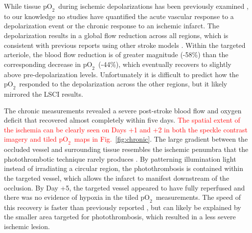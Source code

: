 \documentclass[12pt]{spieman}  %
\newcommand{\pO}{\ensuremath{\text{pO}_2}}
\begin{document}
\begin{spacing}{2}
While tissue \pO\ during ischemic depolarizations has been previously examined \cite{vonBornstadt:2015dj}, to our knowledge no studies have quantified the acute vascular response to a depolarization event or the chronic response to an ischemic infarct. The depolarization results in a global flow reduction across all regions, which is consistent with previous reports using other stroke models \cite{Shin:2006dc,Nakamura:2010wp}. Within the targeted arteriole, the blood flow reduction is of greater magnitude (-58\%) than the corresponding decrease in \pO\ (-44\%), which eventually recovers to slightly above pre-depolarization levels. Unfortunately it is difficult to predict how the \pO\ responded to the depolarization across the other regions, but it likely mirrored the LSCI results.

The chronic measurements revealed a severe post-stroke blood flow and oxygen deficit that recovered almost completely within five days. \textcolor{red}{The spatial extent of the ischemia can be clearly seen on Days +1 and +2 in both the speckle contrast imagery and tiled \pO\ maps in Fig.~\ref{fig:chronic}}. The large gradient between the occluded vessel and surrounding tissue resembles the ischemic penumbra that the photothrombotic technique rarely produces \cite{Carmichael:2005gk}. By patterning illumination light instead of irradiating a circular region, the photothrombosis is contained within the targeted vessel, which allows the infarct to manifest downstream of the occlusion. By Day +5, the targeted vessel appeared to have fully reperfused and there was no evidence of hypoxia in the tiled \pO\ measurements. The speed of this recovery is faster than previously reported \cite{Schrandt:2015gu}, but can likely be explained by the smaller area targeted for photothrombosis, which resulted in a less severe ischemic lesion.




\end{spacing}
\end{document}
